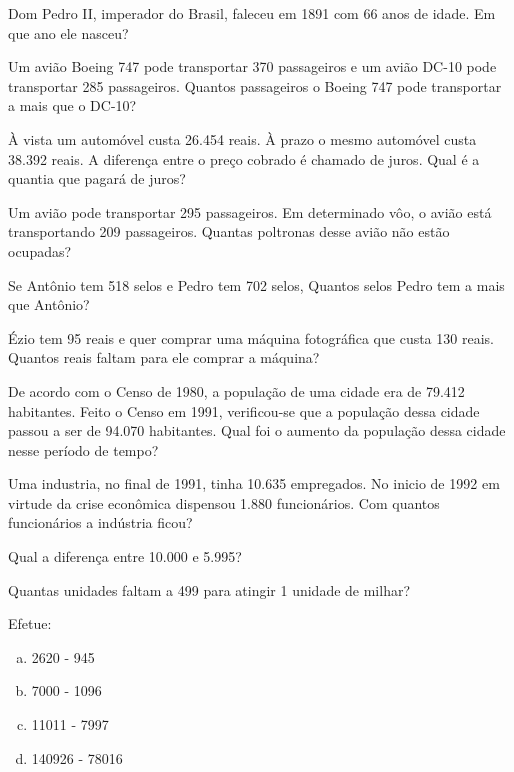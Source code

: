 \item Dom Pedro II, imperador do Brasil, faleceu em 1891 com 66 anos de idade. Em que ano ele nasceu?

\item Um avião Boeing 747 pode transportar 370 passageiros e um avião DC-10 pode transportar 285 passageiros. Quantos passageiros o Boeing 747 pode transportar a mais que o DC-10?

\item À vista um automóvel custa 26.454 reais. À prazo o mesmo automóvel custa 38.392 reais. A diferença entre o preço cobrado é chamado de juros. Qual é a quantia que pagará de juros?

\item Um avião pode transportar 295 passageiros. Em determinado vôo, o avião está transportando 209 passageiros. Quantas poltronas desse avião não estão ocupadas?

\item Se Antônio tem 518 selos e Pedro tem 702 selos, Quantos selos Pedro tem a mais que Antônio?

\item Ézio tem 95 reais e quer comprar uma máquina fotográfica que custa 130 reais. Quantos reais faltam para ele comprar a máquina?

\item De acordo com o Censo de 1980, a população de uma cidade era de 79.412 habitantes. Feito o Censo em 1991, verificou-se que a população dessa cidade passou a ser de 94.070 habitantes. Qual foi o aumento da população dessa cidade nesse período de tempo?

\item Uma industria, no final de 1991, tinha 10.635 empregados. No inicio de 1992 em virtude da crise econômica dispensou 1.880 funcionários. Com quantos funcionários a indústria ficou?

\item Qual a diferença entre 10.000 e 5.995?

\item Quantas unidades faltam a 499 para atingir 1 unidade de milhar?

\item Efetue:
\begin{multicols}{4}
\begin{enumerate}[a)]
	\item 2620 - 945
	\item 7000 - 1096
	\item 11011 - 7997
	\item 140926 - 78016
\end{enumerate}
\end{multicols}

